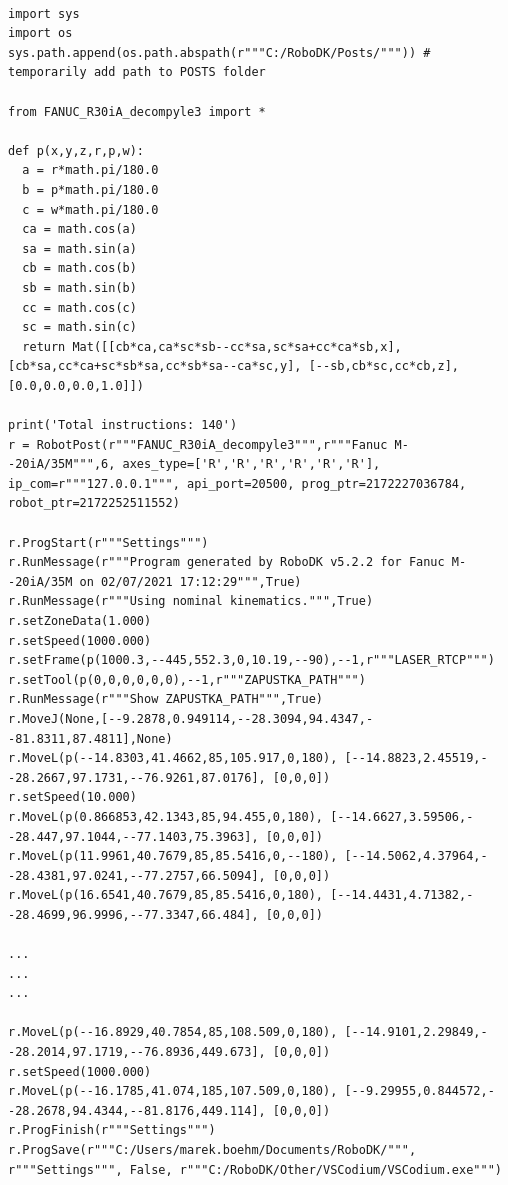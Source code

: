 \begin{lstlisting}[numbers=none,caption={Code snippet of preprocessed program to be executed by post processor},captionpos=b,label={code:preprocessed_python}]

import sys
import os
sys.path.append(os.path.abspath(r"""C:/RoboDK/Posts/""")) # temporarily add path to POSTS folder

from FANUC_R30iA_decompyle3 import *

def p(x,y,z,r,p,w):
  a = r*math.pi/180.0
  b = p*math.pi/180.0
  c = w*math.pi/180.0
  ca = math.cos(a)
  sa = math.sin(a)
  cb = math.cos(b)
  sb = math.sin(b)
  cc = math.cos(c)
  sc = math.sin(c)
  return Mat([[cb*ca,ca*sc*sb--cc*sa,sc*sa+cc*ca*sb,x], [cb*sa,cc*ca+sc*sb*sa,cc*sb*sa--ca*sc,y], [--sb,cb*sc,cc*cb,z], [0.0,0.0,0.0,1.0]])

print('Total instructions: 140')
r = RobotPost(r"""FANUC_R30iA_decompyle3""",r"""Fanuc M--20iA/35M""",6, axes_type=['R','R','R','R','R','R'], ip_com=r"""127.0.0.1""", api_port=20500, prog_ptr=2172227036784, robot_ptr=2172252511552)

r.ProgStart(r"""Settings""")
r.RunMessage(r"""Program generated by RoboDK v5.2.2 for Fanuc M--20iA/35M on 02/07/2021 17:12:29""",True)
r.RunMessage(r"""Using nominal kinematics.""",True)
r.setZoneData(1.000)
r.setSpeed(1000.000)
r.setFrame(p(1000.3,--445,552.3,0,10.19,--90),--1,r"""LASER_RTCP""")
r.setTool(p(0,0,0,0,0,0),--1,r"""ZAPUSTKA_PATH""")
r.RunMessage(r"""Show ZAPUSTKA_PATH""",True)
r.MoveJ(None,[--9.2878,0.949114,--28.3094,94.4347,--81.8311,87.4811],None)
r.MoveL(p(--14.8303,41.4662,85,105.917,0,180), [--14.8823,2.45519,--28.2667,97.1731,--76.9261,87.0176], [0,0,0])
r.setSpeed(10.000)
r.MoveL(p(0.866853,42.1343,85,94.455,0,180), [--14.6627,3.59506,--28.447,97.1044,--77.1403,75.3963], [0,0,0])
r.MoveL(p(11.9961,40.7679,85,85.5416,0,--180), [--14.5062,4.37964,--28.4381,97.0241,--77.2757,66.5094], [0,0,0])
r.MoveL(p(16.6541,40.7679,85,85.5416,0,180), [--14.4431,4.71382,--28.4699,96.9996,--77.3347,66.484], [0,0,0])

...
...
...

r.MoveL(p(--16.8929,40.7854,85,108.509,0,180), [--14.9101,2.29849,--28.2014,97.1719,--76.8936,449.673], [0,0,0])
r.setSpeed(1000.000)
r.MoveL(p(--16.1785,41.074,185,107.509,0,180), [--9.29955,0.844572,--28.2678,94.4344,--81.8176,449.114], [0,0,0])
r.ProgFinish(r"""Settings""")
r.ProgSave(r"""C:/Users/marek.boehm/Documents/RoboDK/""", r"""Settings""", False, r"""C:/RoboDK/Other/VSCodium/VSCodium.exe""")


\end{lstlisting}



